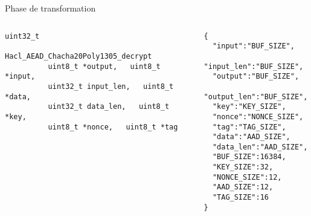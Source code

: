 \documentclass[A4,svgnames,9pt,aspectratio=169]{beamer}
\begin{document}
\begin{frame}[fragile]{Phase de transformation}
 

  \begin{columns}
    \begin{column}{0.5\textwidth}
      \begin{lstlisting}[style=global, caption={Hacl\_AEAD\_Chacha20Poly1305\_decrypt}, gobble=8]
        uint32_t
          Hacl_AEAD_Chacha20Poly1305_decrypt
          uint8_t *output,   uint8_t *input,
          uint32_t input_len,   uint8_t *data,
          uint32_t data_len,   uint8_t *key,
          uint8_t *nonce,   uint8_t *tag
      \end{lstlisting}
      \vspace{2cm}
    \end{column}


    \begin{column}{0.5\textwidth}
      \pause
      \begin{lstlisting}[style=CStyle, caption={matching.json}]
{
  "input":"BUF_SIZE",
  "input_len":"BUF_SIZE",
  "output":"BUF_SIZE",
  "output_len":"BUF_SIZE",
  "key":"KEY_SIZE",
  "nonce":"NONCE_SIZE",
  "tag":"TAG_SIZE",
  "data":"AAD_SIZE",
  "data_len":"AAD_SIZE",
  "BUF_SIZE":16384,
  "KEY_SIZE":32,
  "NONCE_SIZE":12,
  "AAD_SIZE":12,
  "TAG_SIZE":16
}
      \end{lstlisting}
  
    \end{column}
  \end{columns}

\end{frame}
\end{document}
